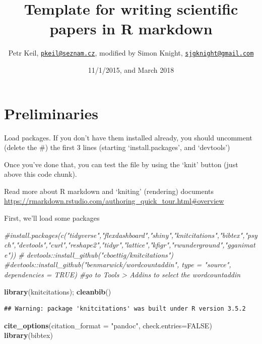 \documentclass[]{article}
\title{Template for writing scientific papers in R markdown}
\author{Petr Keil, \href{mailto:pkeil@seznam.cz}{\nolinkurl{pkeil@seznam.cz}},
modified by Simon Knight,
\href{mailto:sjgknight@gmail.com}{\nolinkurl{sjgknight@gmail.com}}}
\date{11/1/2015, and March 2018}
\newenvironment{Shaded}{\begin{snugshade}}{\end{snugshade}}
\newcommand{\CommentTok}[1]{\textcolor[rgb]{0.56,0.35,0.01}{\textit{#1}}}
\newcommand{\DataTypeTok}[1]{\textcolor[rgb]{0.13,0.29,0.53}{#1}}
\newcommand{\KeywordTok}[1]{\textcolor[rgb]{0.13,0.29,0.53}{\textbf{#1}}}
\newcommand{\NormalTok}[1]{#1}
\newcommand{\OtherTok}[1]{\textcolor[rgb]{0.56,0.35,0.01}{#1}}
\newcommand{\StringTok}[1]{\textcolor[rgb]{0.31,0.60,0.02}{#1}}
\begin{document}
\maketitle

\hypertarget{preliminaries}{%
\section{Preliminaries}\label{preliminaries}}

Load packages. If you don't have them installed already, you should
uncomment (delete the \#) the first 3 lines (starting
`install.packages', and `devtools')

Once you've done that, you can test the file by using the `knit' button
(just above this code chunk).

Read more about R markdown and `kniting' (rendering) documents
\url{https://rmarkdown.rstudio.com/authoring_quick_tour.html\#overview}

First, we'll load some packages

\begin{Shaded}
\begin{Highlighting}[]
\CommentTok{#install.packages(c("tidyverse","flexdashboard","shiny","knitcitations","bibtex","psych","devtools","curl","reshape2","tidyr","lattice","kfigr","rwunderground","gganimate"))}
\CommentTok{# devtools::install_github("cboettig/knitcitations")}
\CommentTok{#devtools::install_github("benmarwick/wordcountaddin", type = "source", dependencies = TRUE)}
\CommentTok{#go to Tools > Addins to select the wordcountaddin }

  \KeywordTok{library}\NormalTok{(knitcitations); }\KeywordTok{cleanbib}\NormalTok{()}
\end{Highlighting}
\end{Shaded}

\begin{verbatim}
## Warning: package 'knitcitations' was built under R version 3.5.2
\end{verbatim}

\begin{Shaded}
\begin{Highlighting}[]
  \KeywordTok{cite_options}\NormalTok{(}\DataTypeTok{citation_format =} \StringTok{"pandoc"}\NormalTok{, }\DataTypeTok{check.entries=}\OtherTok{FALSE}\NormalTok{)}
  \KeywordTok{library}\NormalTok{(bibtex)}
\end{Highlighting}
\end{Shaded}
\end{document}
